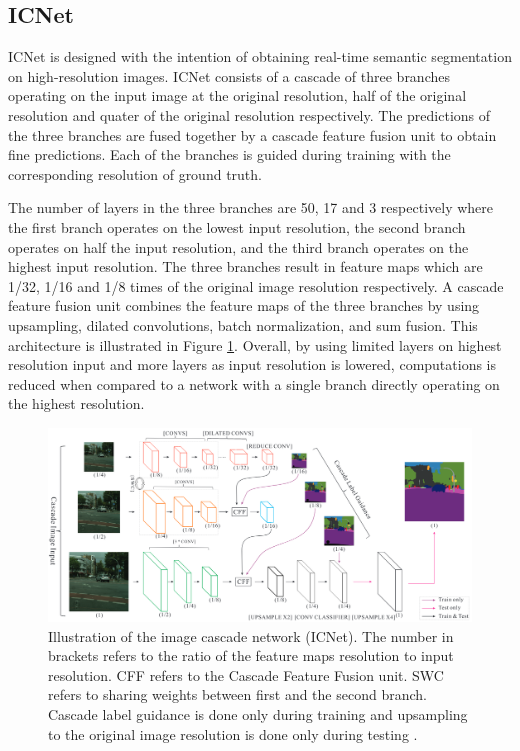 \subsection{ICNet}

ICNet \cite{DBLP:journals/corr/ZhaoQSSJ17} is designed with the intention of obtaining real-time semantic segmentation on high-resolution images. ICNet consists of a cascade of three branches operating on the input image at the original resolution, half of the original resolution and quater of the original resolution respectively. The predictions of the three branches are fused together by a cascade feature fusion unit to obtain fine predictions. Each of the branches is guided during training with the corresponding resolution of ground truth. 

The number of layers in the three branches are 50, 17 and 3 respectively where the first branch operates on the lowest input resolution, the second branch operates on half the input resolution, and the third branch operates on the highest input resolution. The three branches result in feature maps which are 1/32, 1/16 and 1/8 times of the original image resolution respectively. A cascade feature fusion unit combines the feature maps of the three branches by using upsampling, dilated convolutions, batch normalization, and sum fusion. This architecture is illustrated in Figure \ref{Fig:icnet}. Overall, by using limited layers on highest resolution input and more layers as input resolution is lowered, computations is reduced when compared to a network with a single branch directly operating on the highest resolution. 

	\begin{figure}[h]
		\centering
		\includegraphics[width=1\linewidth]{images/icnet}
		\caption{Illustration of the image cascade network (ICNet). The number in brackets refers to the ratio of the feature maps resolution to input resolution. CFF refers to the Cascade Feature Fusion unit. SWC refers to sharing weights between first and the second branch. Cascade label guidance is done only during training and upsampling to the original image resolution is done only during testing \cite{DBLP:journals/corr/ZhaoQSSJ17}.}
		\label{Fig:icnet}
	\end{figure}

